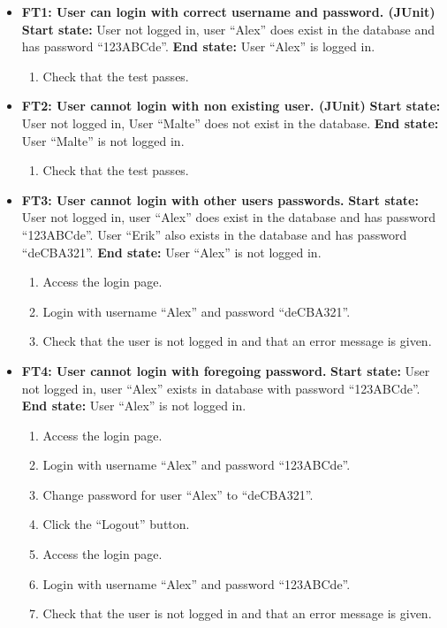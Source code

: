 \documentclass{article}
\begin{document}
	\begin{itemize}
		\item \textbf{FT1:  User can login with correct username and 			password. (JUnit)} \newline
		\textbf{Start state:} User not logged in, user “Alex” does exist in the database and has password “123ABCde”. \newline
		\textbf{End state:} User “Alex” is logged in. 
		\begin{enumerate}
			\item Check that the test passes.
		\end{enumerate}
		
		\item \textbf{FT2:  User cannot login with non existing user. (JUnit)} \newline
		\textbf{Start state:} User not logged in, User “Malte” does not exist in the database. \newline
		\textbf{End state:} User “Malte” is not logged in.  
		\begin{enumerate}
			\item Check that the test passes.
		\end{enumerate}
		
		\item \textbf{FT3: User cannot login with other users passwords.} \newline
		\textbf{Start state:} User not logged in, user “Alex” does exist in the database and has password “123ABCde”. User “Erik” also exists in the database and has password “deCBA321”. \newline
		\textbf{End state:} User “Alex” is not logged in.   
		\begin{enumerate}
			\item  Access the login page. 
			\item Login with username “Alex” and password “deCBA321”. 
			\item Check that the user is not logged in and that an error message is given.
		\end{enumerate}
		
		\item \textbf{FT4: User cannot login with foregoing password.} \newline
		\textbf{Start state:} User not logged in, user “Alex” exists in database with password “123ABCde”.  \newline
		\textbf{End state:} User “Alex” is not logged in.   
		\begin{enumerate}
			\item Access the login page. 
			\item Login with username “Alex” and password “123ABCde”.
			\item Change password for user “Alex” to “deCBA321”.
			\item Click the “Logout” button.
			\item Access the login page. 
			\item Login with username “Alex” and password “123ABCde”.
			\item Check that the user is not logged in and that an error message is given. 
		\end{enumerate}
		

\end{itemize}
\end{document}
